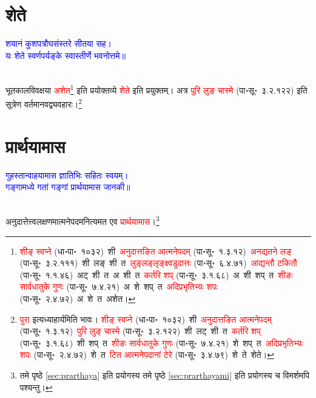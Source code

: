 \section[शेते]{शेते}
\centering\textcolor{blue}{शयानं कुशपत्रौघसंस्तरे सीतया सह।\nopagebreak\\
यः शेते स्वर्णपर्यङ्के स्वास्तीर्णे भवनोत्तमे॥}\nopagebreak\\
\\
\fontsize{14}{21}\selectfont\begin{sloppypar}\justifying\noindent\hspace{10mm} भूतकालविवक्षया \textcolor{red}{अशेत}\footnote{\textcolor{red}{शीङ् स्वप्ने} (धा॰पा॰~१०३२)~\arrow शी~\arrow \textcolor{red}{अनुदात्तङित आत्मने\-पदम्} (पा॰सू॰~१.३.१२)~\arrow \textcolor{red}{अनद्यतने लङ्} (पा॰सू॰~३.२.१११)~\arrow शी~लङ्~\arrow शी~त~\arrow \textcolor{red}{लुङ्लङ्लृङ्क्ष्वडुदात्तः} (पा॰सू॰~६.४.७१)~\arrow \textcolor{red}{आद्यन्तौ टकितौ} (पा॰सू॰~१.१.४६)~\arrow अट्~शी~त~\arrow अ~शी~त~\arrow \textcolor{red}{कर्तरि शप्} (पा॰सू॰~३.१.६८)~\arrow अ~शी~शप्~त~\arrow \textcolor{red}{शीङः सार्वधातुके गुणः} (पा॰सू॰~७.४.२१)~\arrow अ~शे~शप्~त~\arrow \textcolor{red}{अदिप्रभृतिभ्यः शपः} (पा॰सू॰~२.४.७२)~\arrow अ~शे~त~\arrow अशेत।} इति प्रयोक्तव्ये \textcolor{red}{शेते} इति प्रयुक्तम्। अत्र \textcolor{red}{पुरि लुङ् चास्मे} (पा॰सू॰~३.२.१२२) इति सूत्रेण वर्तमानवद्व्यवहारः।\footnote{\textcolor{red}{पुरा} इत्यध्याहार्यमिति भावः। \textcolor{red}{शीङ् स्वप्ने} (धा॰पा॰~१०३२)~\arrow शी~\arrow \textcolor{red}{अनुदात्तङित आत्मने\-पदम्} (पा॰सू॰~१.३.१२)~\arrow \textcolor{red}{पुरि लुङ् चास्मे} (पा॰सू॰~३.२.१२२)~\arrow शी~लट्~\arrow शी~त~\arrow \textcolor{red}{कर्तरि शप्} (पा॰सू॰~३.१.६८)~\arrow शी~शप्~त~\arrow \textcolor{red}{शीङः सार्वधातुके गुणः} (पा॰सू॰~७.४.२१)~\arrow शे~शप्~त~\arrow \textcolor{red}{अदिप्रभृतिभ्यः शपः} (पा॰सू॰~२.४.७२)~\arrow शे~त~\arrow \textcolor{red}{टित आत्मनेपदानां टेरे} (पा॰सू॰~३.४.७९)~\arrow शे~ते~\arrow शेते।}\end{sloppypar}
\section[प्रार्थयामास]{प्रार्थयामास}
\centering\textcolor{blue}{गुहस्तान्वाहयामास ज्ञातिभिः सहितः स्वयम्।\nopagebreak\\
गङ्गामध्ये गतां गङ्गां प्रार्थयामास जानकी॥}\nopagebreak\\
\\
\fontsize{14}{21}\selectfont\begin{sloppypar}\justifying\noindent\hspace{10mm} अनुदात्तेत्त्व\-लक्षणमात्मनेपदमनित्यमत एव \textcolor{red}{प्रार्थयामास}।\footnote{\pageref{sec:prarthaya}तमे पृष्ठे \ref{sec:prarthaya}  इति प्रयोगस्य \pageref{sec:prarthayami}तमे पृष्ठे \ref{sec:prarthayami}  इति प्रयोगस्य च विमर्शमपि पश्यन्तु।}\end{sloppypar}
